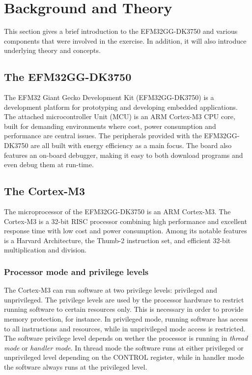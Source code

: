 
\chapter{Background and Theory}
This section gives a brief introduction to the EFM32GG-DK3750 and various components that were involved in the exercise. In addition, it will also introduce underlying theory and concepts.

\section{The EFM32GG-DK3750}
The EFM32 Giant Gecko Development Kit (EFM32GG-DK3750) is a development platform for prototyping and developing embedded applications. The attached microcontroller Unit (MCU) is an ARM Cortex-M3 CPU core, built for demanding environments where cost, power consumption and performance are central issues. The peripherals provided with the EFM32GG-DK3750 are all built with energy efficiency as a main focus. The board also features an on-board debugger, making it easy to both download programs and even debug them at run-time.

\section{The Cortex-M3}
The microprocessor of the EFM32GG-DK3750 is an ARM Cortex-M3. The Cortex-M3 is a 32-bit RISC processor combining high performance and excellent response time with low cost and power consumption. Among its notable features is a Harvard Architecture, the Thumb-2 instruction set, and efficient 32-bit multiplication and division.

\subsection{Processor mode and privilege levels}
The Cortex-M3 can run software at two privilege levels: privileged and unprivileged. The privilege levels are used by the processor hardware to restrict running software to certain resources only. This is necessary in order to provide memory protection, for instance. In privileged mode, running software has access to all instructions and resources, while in unprivileged mode access is restricted. The software privilege level depends on wether the processor is running in \emph{thread mode} or \emph{handler mode}. In thread mode the software runs at either privileged or unprivileged level depending on the CONTROL register, while in handler mode the software always runs at the privileged level.

